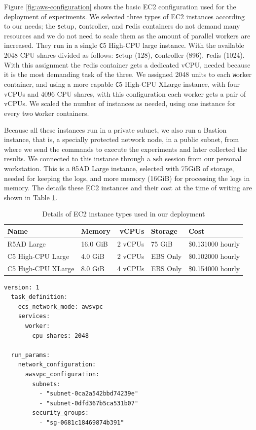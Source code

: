 \documentclass[review]{elsarticle}
\begin{document}
Figure \ref{fig:aws-configuration} shows the basic EC2 configuration used for the deployment
of experiments. We selected three types of EC2 instances according to our needs; the  
{\texttt setup}, {\texttt controller}, and {\texttt redis} containers do not demand many resources
and we do not need to scale them as the amount of parallel workers are increased. They run in a
single {\texttt C5  High-CPU large} instance. With the available 2048 CPU shares divided as follows:
{\texttt setup} (128),  {\texttt controller} (896), {\texttt redis} (1024). With this assignment 
the {\texttt redis} container gets a dedicated vCPU, needed because it is the most demanding 
task of the three. We assigned 2048 units to each {\texttt worker} container, and using a more 
capable {\texttt C5 High-CPU XLarge} instance,  with 
four vCPUs and 4096 CPU shares, with this configuration each worker gets a pair of vCPUs.  
We scaled the number of instances as needed, using one instance for every two {\texttt worker} containers. 

Because all these instances run in a private subnet, we also
run a Bastion instance, that is, a specially protected network node, in a public subnet, from where we send the
commands to execute the experiments
and later collected the results. We connected to this instance through a {\texttt ssh} session from 
our personal workstation. This is a {\texttt R5AD Large} instance, selected with 75GiB of storage, needed for
keeping the logs, and more memory (16GiB) for processing the logs in memory. The details these EC2 instances 
and their cost at the time of writing are shown in Table \ref{tab:ec2}.


\begin{table}[h!tbp]
  \small
  \caption{Details of EC2 instance types used in our deployment}
  \label{tab:ec2} 
  \centering
  \small
  \begin{tabular}{|l|l|r|l|l|}
    \hline
    Name & Memory & vCPUs & Storage  & Cost \\ \hline
    R5AD Large	&	16.0 GiB	& 2 vCPUs	& 75 GiB 	& \$0.131000 hourly \\ \hline
    C5 High-CPU Large	&	4.0 GiB	& 2 vCPUs	& EBS Only 	& \$0.102000 hourly \\ \hline
    C5 High-CPU XLarge	&	8.0 GiB	& 4 vCPUs	& EBS Only 	& \$0.154000 hourly \\ \hline
  \end{tabular}
\end{table}

\begin{lstlisting}[caption=ecs-params.yml , label=code:ecs]
  version: 1
  task_definition:
    ecs_network_mode: awsvpc
    services:
      worker:
        cpu_shares: 2048
  
  run_params:
    network_configuration:
      awsvpc_configuration:
        subnets:
          - "subnet-0ca2a542bbd74239e"
          - "subnet-0dfd367b5ca531b07"
        security_groups:
          - "sg-0681c18469874b391"  
\end{lstlisting}
\end{document}
